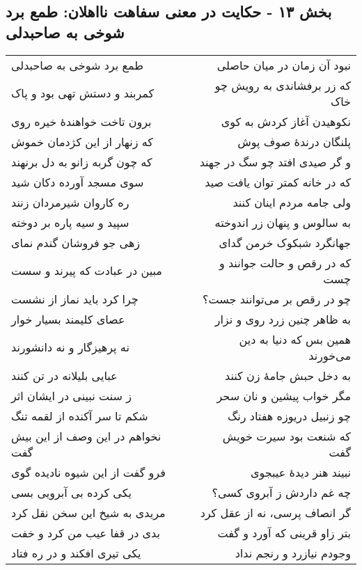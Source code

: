 \begin{center}
\section*{بخش ۱۳ - حکایت در معنی سفاهت نااهلان: طمع برد شوخی به صاحبدلی}
\label{sec:013}
\begin{longtable}{l p{0.5cm} r}
طمع برد شوخی به صاحبدلی
&&
نبود آن زمان در میان حاصلی
\\
کمربند و دستش تهی بود و پاک
&&
که زر برفشاندی به رویش چو خاک
\\
برون تاخت خواهندهٔ خیره روی
&&
نکوهیدن آغاز کردش به کوی
\\
که زنهار از این کژدمان خموش
&&
پلنگان درندهٔ صوف پوش
\\
که چون گربه زانو به دل برنهند
&&
و گر صیدی افتد چو سگ در جهند
\\
سوی مسجد آورده دکان شید
&&
که در خانه کمتر توان یافت صید
\\
ره کاروان شیرمردان زنند
&&
ولی جامه مردم اینان کنند
\\
سپید و سیه پاره بر دوخته
&&
به سالوس و پنهان زر اندوخته
\\
زهی جو فروشان گندم نمای
&&
جهانگرد شبکوک خرمن گدای
\\
مبین در عبادت که پیرند و سست
&&
که در رقص و حالت جوانند و چست
\\
چرا کرد باید نماز از نشست
&&
چو در رقص بر می‌توانند جست؟
\\
عصای کلیمند بسیار خوار
&&
به ظاهر چنین زرد روی و نزار
\\
نه پرهیزگار و نه دانشورند
&&
همین بس که دنیا به دین می‌خورند
\\
عبایی بلیلانه در تن کنند
&&
به دخل حبش جامهٔ زن کنند
\\
ز سنت نبینی در ایشان اثر
&&
مگر خواب پیشین و نان سحر
\\
شکم تا سر آکنده از لقمه تنگ
&&
چو زنبیل دریوزه هفتاد رنگ
\\
نخواهم در این وصف از این بیش گفت
&&
که شنعت بود سیرت خویش گفت
\\
فرو گفت از این شیوه نادیده گوی
&&
نبیند هنر دیدهٔ عیبجوی
\\
یکی کرده بی آبرویی بسی
&&
چه غم داردش ز آبروی کسی؟
\\
مریدی به شیخ این سخن نقل کرد
&&
گر انصاف پرسی، نه از عقل کرد
\\
بدی در قفا عیب من کرد و خفت
&&
بتر زاو قرینی که آورد و گفت
\\
یکی تیری افکند و در ره فتاد
&&
وجودم نیازرد و رنجم نداد
\\

\end{longtable}
\end{center}

